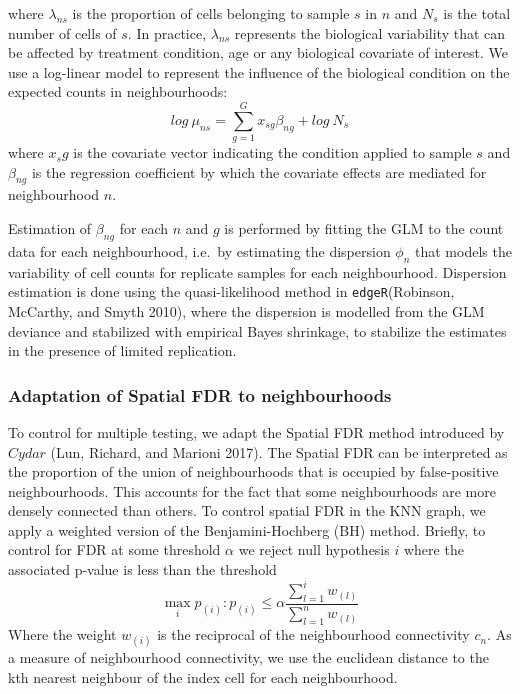 \documentclass[
]{article}
\begin{document}
where \(\lambda_{ns}\) is the proportion of cells belonging to sample
\(s\) in \(n\) and \(N_s\) is the total number of cells of \(s\). In
practice, \(\lambda_{ns}\) represents the biological variability that
can be affected by treatment condition, age or any biological covariate
of interest. We use a log-linear model to represent the influence of the
biological condition on the expected counts in neighbourhoods: \[
log\ \mu_{ns} = \sum_{g=1}^{G}x_{sg}\beta_{ng} + log\ N_s
\] where \(x_sg\) is the covariate vector indicating the condition
applied to sample \(s\) and \(\beta_{ng}\) is the regression coefficient
by which the covariate effects are mediated for neighbourhood \(n\).

Estimation of \(\beta_{ng}\) for each \(n\) and \(g\) is performed by
fitting the GLM to the count data for each neighbourhood, i.e.~by
estimating the dispersion \(\phi_{n}\) that models the variability of
cell counts for replicate samples for each neighbourhood. Dispersion
estimation is done using the quasi-likelihood method in
\texttt{edgeR}(Robinson, McCarthy, and Smyth 2010), where the dispersion
is modelled from the GLM deviance and stabilized with empirical Bayes
shrinkage, to stabilize the estimates in the presence of limited
replication.

\hypertarget{adaptation-of-spatial-fdr-to-neighbourhoods}{%
\subsubsection{Adaptation of Spatial FDR to
neighbourhoods}\label{adaptation-of-spatial-fdr-to-neighbourhoods}}

To control for multiple testing, we adapt the Spatial FDR method
introduced by \(Cydar\) (Lun, Richard, and Marioni 2017). The Spatial
FDR can be interpreted as the proportion of the union of neighbourhoods
that is occupied by false-positive neighbourhoods. This accounts for the
fact that some neighbourhoods are more densely connected than others. To
control spatial FDR in the KNN graph, we apply a weighted version of the
Benjamini-Hochberg (BH) method. Briefly, to control for FDR at some
threshold \(\alpha\) we reject null hypothesis \(i\) where the
associated p-value is less than the threshold \[
\max_i{p_{(i)}: p_{(i)}\le \alpha\frac{\sum_{l=1}^{i}w_{(l)}}{\sum_{l=1}^{n}w_{(l)}}}
\] Where the weight \(w_{(i)}\) is the reciprocal of the neighbourhood
connectivity \(c_n\). As a measure of neighbourhood connectivity, we use
the euclidean distance to the kth nearest neighbour of the index cell
for each neighbourhood.
\end{document}
